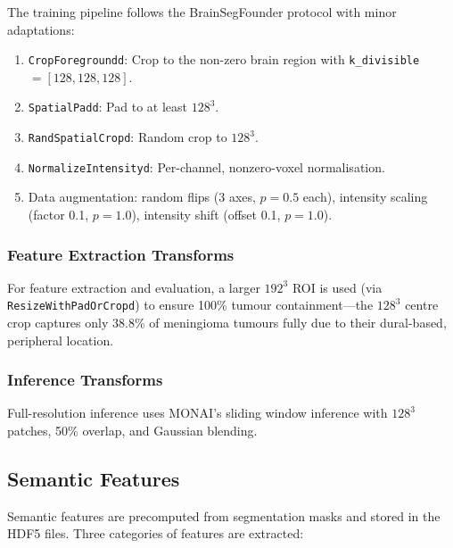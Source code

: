 The training pipeline follows the BrainSegFounder protocol with minor
adaptations:
\begin{enumerate}[leftmargin=*]
  \item \texttt{CropForegroundd}: Crop to the non-zero brain region with
    \texttt{k\_divisible}$=[128, 128, 128]$.
  \item \texttt{SpatialPadd}: Pad to at least $128^3$.
  \item \texttt{RandSpatialCropd}: Random crop to $128^3$.
  \item \texttt{NormalizeIntensityd}: Per-channel, nonzero-voxel
    normalisation.
  \item Data augmentation: random flips (3 axes, $p=0.5$ each),
    intensity scaling (factor 0.1, $p=1.0$), intensity shift (offset 0.1,
    $p=1.0$).
\end{enumerate}

\subsubsection{Feature Extraction Transforms}

For feature extraction and evaluation, a larger $192^3$ ROI is used (via
\texttt{ResizeWithPadOrCropd}) to ensure 100\% tumour containment---the
$128^3$ centre crop captures only 38.8\% of meningioma tumours fully due
to their dural-based, peripheral location.

\subsubsection{Inference Transforms}

Full-resolution inference uses MONAI's sliding window inference with $128^3$
patches, 50\% overlap, and Gaussian blending.

\subsection{Semantic Features}
\label{sec:data:semantic}

Semantic features are precomputed from segmentation masks and stored in the
HDF5 files. Three categories of features are extracted:

